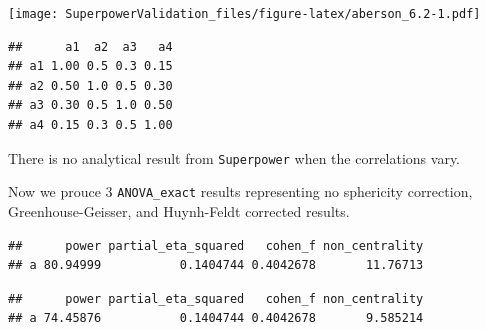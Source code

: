 \documentclass[
]{book}
\newenvironment{Shaded}{\begin{snugshade}}{\end{snugshade}}
\newcommand{\AttributeTok}[1]{\textcolor[rgb]{0.77,0.63,0.00}{#1}}
\newcommand{\ConstantTok}[1]{\textcolor[rgb]{0.00,0.00,0.00}{#1}}
\newcommand{\FunctionTok}[1]{\textcolor[rgb]{0.00,0.00,0.00}{#1}}
\newcommand{\NormalTok}[1]{#1}
\newcommand{\OtherTok}[1]{\textcolor[rgb]{0.56,0.35,0.01}{#1}}
\newcommand{\SpecialCharTok}[1]{\textcolor[rgb]{0.00,0.00,0.00}{#1}}
\newcommand{\StringTok}[1]{\textcolor[rgb]{0.31,0.60,0.02}{#1}}
\begin{document}
\texttt{[image: SuperpowerValidation\_files/figure-latex/aberson\_6.2-1.pdf]}

\begin{Shaded}
\end{Shaded}

\begin{verbatim}
##      a1  a2  a3   a4
## a1 1.00 0.5 0.3 0.15
## a2 0.50 1.0 0.5 0.30
## a3 0.30 0.5 1.0 0.50
## a4 0.15 0.3 0.5 1.00
\end{verbatim}

There is no analytical result from \texttt{Superpower} when the correlations vary.

Now we prouce 3 \texttt{ANOVA\_exact} results representing no sphericity correction, Greenhouse-Geisser, and Huynh-Feldt corrected results.

\begin{Shaded}
\end{Shaded}

\begin{verbatim}
##      power partial_eta_squared   cohen_f non_centrality
## a 80.94999           0.1404744 0.4042678       11.76713
\end{verbatim}

\begin{Shaded}
\end{Shaded}

\begin{verbatim}
##      power partial_eta_squared   cohen_f non_centrality
## a 74.45876           0.1404744 0.4042678       9.585214
\end{verbatim}
\end{document}
